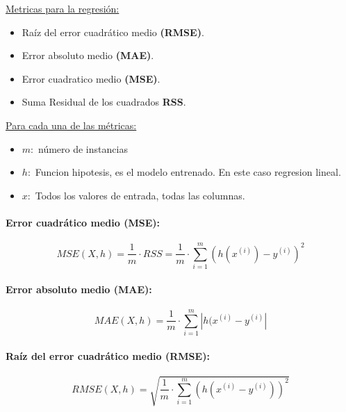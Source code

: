 \documentclass[../main.tex]{subfiles}
\begin{document}
    		\underline{Metricas para la regresión:}
    		\begin{itemize}
    			\item Raíz del error cuadrático medio \textbf{(RMSE)}.
    			\item Error absoluto medio \textbf{(MAE)}.
    			\item Error cuadratico medio \textbf{(MSE)}.
    			\item Suma Residual de los cuadrados \textbf{RSS}.
    		\end{itemize}
		
    		\underline{Para cada una de las métricas:}
    		\begin{itemize}
    			\item $m:$ número de instancias
    			\item $h:$ Funcion hipotesis, es el modelo entrenado. En este caso regresion lineal.
    			\item $x:$ Todos los valores de entrada, todas las columnas.
    		\end{itemize}
    		
    		\paragraph{Error cuadrático medio \textbf{(MSE)}:}
    		\begin{equation}
    			MSE(X, h) = \frac{1}{m} \cdot RSS = \frac{1}{m} \cdot \sum_{i=1}^{m} (h(x^{(i)}) - y^{(i)})^2
    		\end{equation}
    		
    		\paragraph{Error absoluto medio \textbf{(MAE)}:}
    		\begin{equation}
    			MAE(X, h) = \frac{1}{m} \cdot \sum_{i=1}^{m} |h(x^{(i)} - y^{(i)}|
    		\end{equation}
    		
    		\paragraph{Raíz del error cuadrático medio \textbf{(RMSE)}:}
    		\begin{equation}
    			RMSE(X, h) = \sqrt{\frac{1}{m} \cdot \sum_{i=1}^{m}(h(x^{(i)}-y^{(i)}))^2}
    		\end{equation}
		          
\end{document}
